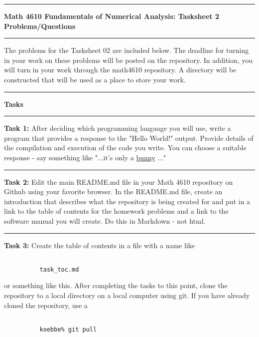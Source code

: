 \documentclass[10pt,fleqn]{article}
\begin{document}
\vskip0.1in\hrule\vskip0.1in \noindent
{\bf{\Large Math 4610 Fundamentals of Numerical Analysis: Tasksheet 2 Problems/Questions}}
\vskip0.1in\hrule\vskip0.1in \noindent
The problems for the Tasksheet 02 are included below. The deadline for turning
in your work on these problems will be posted on the repository. In addition,
you will turn in your work through the math4610 repository. A directory will be
constructed that will be used as a place to store your work.
\vskip0.1in\hrule\vskip0.1in \noindent
{\bf{\large Tasks}}
\vskip0.1in\hrule\vskip0.1in \noindent
\begin{trivlist}
  \item[\bf Task 1:] After deciding which programming language you will use,
        write a program that provides a response to the "Hello World!" output.
        Provide details of the compilation and execution of the code you write.
        You can choose a suitable response - say something like
        "...it's only a \href{../audio/mp11.wav}{bunny} ..."

\vskip0.1in\hrule\vskip0.1in \noindent
  \item[\bf Task 2:] Edit the main README.md file in your Math 4610 repository
        on Github using your favorite browser. In the README.md file, create an
        introduction that describes what the repository is being created for and
        put in a link to the table of contents for the homework problems and a
        link to the software manual you will create. Do this in Markdown - not
        html.
\vskip0.1in\hrule\vskip0.1in \noindent
  \item[\bf Task 3:] Create the table of contents in a file with a name like
        \begin{verbatim}

          task_toc.md

        \end{verbatim}
        or something like this. After completing the tasks to this point, clone
        the repository to a local directory on a local computer using git. If
        you have already cloned the repository, use a
        \begin{verbatim}

          koebbe% git pull


\end{verbatim}
\end{trivlist}
\end{document}
